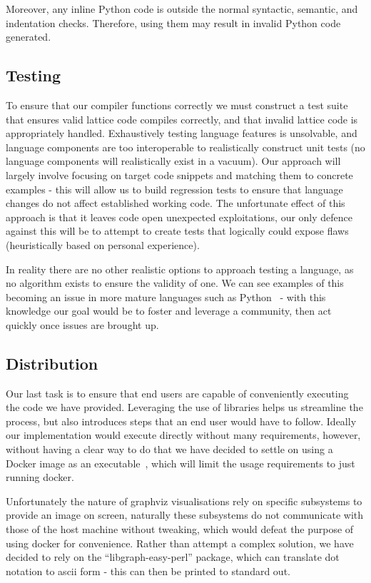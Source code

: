 Moreover, any inline Python code is outside the normal syntactic, semantic, and indentation checks.
Therefore, using them may result in invalid Python code generated.
\subsection{Testing}
To ensure that our compiler functions correctly we must construct a test suite that ensures valid lattice code compiles
correctly, and that invalid lattice code is appropriately handled.
Exhaustively testing language features is unsolvable, and language components are too interoperable to realistically
construct unit tests (no language components will realistically exist in a vacuum).
Our approach will largely involve focusing on target code snippets and matching them to concrete examples - this will
allow us to build regression tests to ensure that language changes do not affect established working code.
The unfortunate effect of this approach is that it leaves code open unexpected exploitations, our only defence against
this will be to attempt to create tests that logically could expose flaws (heuristically based on personal experience).

In reality there are no other realistic options to approach testing a language, as no algorithm exists to ensure the
validity of one.
We can see examples of this becoming an issue in more mature languages such as Python~\cite{PythonIssue} - with this
knowledge our goal would be to foster and leverage a community, then act quickly once issues are brought up.

\subsection{Distribution}
Our last task is to ensure that end users are capable of conveniently executing the code we have provided.
Leveraging the use of libraries helps us streamline the process, but also introduces steps that an end user would have
to follow.
Ideally our implementation would execute directly without many requirements, however, without having a clear way to do
that we have decided to settle on using a Docker image as an executable~\cite{DockerExec}, which will limit the usage
requirements to just running docker.

Unfortunately the nature of graphviz visualisations rely on specific subsystems to provide an image on screen, naturally
these subsystems do not communicate with those of the host machine without tweaking, which would defeat the purpose of
using docker for convenience.
Rather than attempt a complex solution, we have decided to rely on the ``libgraph-easy-perl'' package, which can
translate dot notation to ascii form - this can then be printed to standard out.

